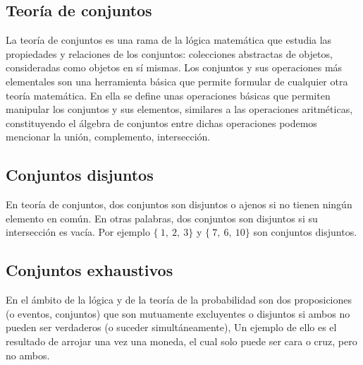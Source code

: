 \subsection{Teoría de conjuntos}

La teoría de conjuntos es una rama de la lógica matemática que estudia las propiedades y relaciones de los conjuntos: colecciones abstractas de objetos, consideradas como objetos en sí mismas. Los conjuntos y sus operaciones más elementales son una herramienta básica que permite formular de cualquier otra teoría matemática. En ella se define  unas operaciones básicas que permiten manipular los conjuntos y sus elementos, similares a las operaciones aritméticas, constituyendo el álgebra de conjuntos entre dichas operaciones podemos mencionar la unión, complemento, intersección.

\subsection{Conjuntos disjuntos}
En teoría de conjuntos, dos conjuntos son disjuntos o ajenos si no tienen ningún elemento en común. En otras palabras, dos conjuntos son disjuntos si su intersección es vacía. Por ejemplo $\{~1,~2,~3\}$ y $\{~7,~6,~10\}$ son conjuntos disjuntos.

\subsection{Conjuntos exhaustivos} 
En el ámbito de la lógica y de la teoría de la probabilidad son dos proposiciones (o eventos, conjuntos) que son mutuamente excluyentes o disjuntos si ambos no pueden ser verdaderos (o suceder simultáneamente), Un ejemplo de ello es el resultado de arrojar una vez una moneda, el cual solo puede ser cara o cruz, pero no ambos.  